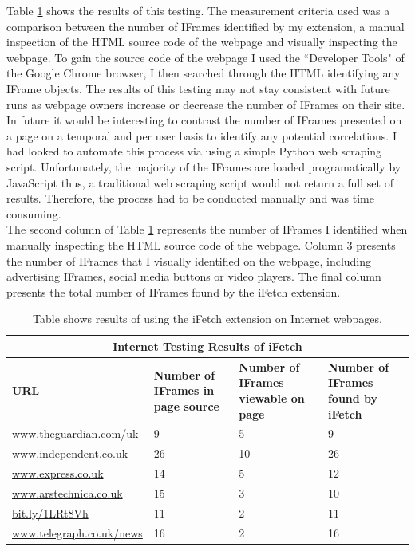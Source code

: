 \documentclass[12pt]{article}
\begin{document}
Table \ref{table:3} shows the results of this testing. The measurement criteria used was a comparison between the number of IFrames identified by my extension, a manual inspection of the HTML source code of the webpage and visually inspecting the webpage. To gain the source code of the webpage I used the ``Developer Tools" of the Google Chrome browser, I then searched through the HTML identifying any IFrame objects. The results of this testing may not stay consistent with future runs as webpage owners increase or decrease the number of IFrames on their site. In future it would be interesting to contrast the number of IFrames presented on a page on a temporal and per user basis to identify any potential correlations. I had looked to automate this process via using a simple Python web scraping script. Unfortunately, the majority of the IFrames are loaded programatically by JavaScript thus, a traditional web scraping script would not return a full set of results. Therefore, the process had to be conducted manually and was time consuming. \\

The second column of Table \ref{table:3} represents the number of IFrames I identified when manually inspecting the HTML source code of the webpage. Column 3 presents the number of IFrames that I visually identified on the webpage, including advertising IFrames, social media buttons or video players. The final column presents the total number of IFrames found by the iFetch extension.    

{
\begin{table} [H]
\centering
\begin{tabular}{ |p{4cm}|p{3cm}|p{3cm}| p{3cm} | }
\hline
\multicolumn{4}{|c|}{\textbf{Internet Testing Results of iFetch}} \\
\hline
\textbf{URL} & \textbf{Number of IFrames in page source} & \textbf{Number of IFrames viewable on page} & \textbf{Number of IFrames found by iFetch} \\
\hline
\url{www.theguardian.com/uk} & 9 & 5 & 9 \\
\hline
\url{www.independent.co.uk} & 26 & 10 & 26 \\
\hline
\url{www.express.co.uk} & 14 & 5 & 12 \\
\hline
\url{www.arstechnica.co.uk} & 15 & 3 & 10  \\
\hline
\url{bit.ly/1LRt8Vh} & 11 & 2 & 11 \\
\hline
\url{www.telegraph.co.uk/news} & 16 & 2 & 16\\
\hline
\end{tabular}
\caption{Table shows results of using the iFetch extension on Internet webpages.}
\label{table:3}
\end{table}
}
\end{document}
